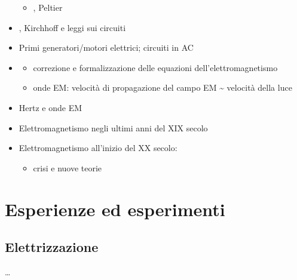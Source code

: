 \documentclass[letterpaper,10pt,italian]{jupyterBook}
\begin{document}
\begin{itemize}
\begin{itemize}
\item {} 
, Peltier

\end{itemize}

\item {} 
, Kirchhoff e leggi sui circuiti

\item {} 
\sphinxAtStartPar
Primi generatori/motori elettrici; circuiti in AC

\item {} 
\sphinxAtStartPar
{}
\begin{itemize}
\item {} 
\sphinxAtStartPar
correzione e formalizzazione delle equazioni dell’elettromagnetismo

\item {} 
\sphinxAtStartPar
onde EM: velocità di propagazione del campo EM \textasciitilde{} velocità della luce

\end{itemize}

\item {} 
\sphinxAtStartPar
Hertz e onde EM

\item {} 
\sphinxAtStartPar
Elettromagnetismo negli ultimi anni del XIX secolo

\item {} 
\sphinxAtStartPar
Elettromagnetismo all’inizio del XX secolo:
\begin{itemize}
\item {} 
\sphinxAtStartPar
crisi e nuove teorie

\end{itemize}

\end{itemize}

\sphinxstepscope


\section{Esperienze ed esperimenti}
\label{\detokenize{ch/electromagnetism/intro-experiments:esperienze-ed-esperimenti}}\label{\detokenize{ch/electromagnetism/intro-experiments:physics-hs-electromagnetism-intro-experiments}}\label{\detokenize{ch/electromagnetism/intro-experiments::doc}}

\subsection{Elettrizzazione}
\label{\detokenize{ch/electromagnetism/intro-experiments:elettrizzazione}}
\sphinxAtStartPar
…
\end{document}
